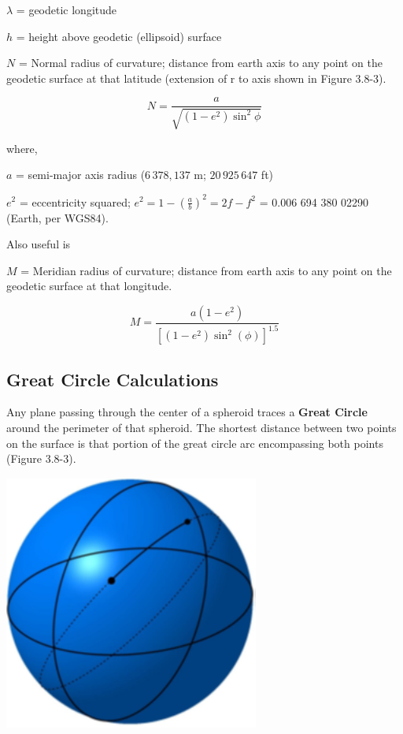 \documentclass[
]{book}
\begin{document}
\(\lambda\) = geodetic longitude

\(h\) = height above geodetic (ellipsoid) surface

\(N\) = Normal radius of curvature; distance from earth axis to any point on the geodetic surface at that latitude (extension of r to axis shown in Figure 3.8-3).

\[N = \frac{a}{\sqrt{ \left(1 - e^2 \right) \sin^{2}{\phi}}}\]

where,

\(a\) = semi-major axis radius (\(6\,378,137\) m; \(20\,925\,647\) ft)

\(e^2\) = eccentricity squared; \(e^{2} = 1 - \left( \frac{a}{b} \right)^{2} = 2f - f^{2}\) = 0.006 694 380 02290 (Earth, per WGS84).

Also useful is

\(M\) = Meridian radius of curvature; distance from earth axis to any point on the geodetic surface at that longitude.

\[M = \frac{a \left(1 - e^{2} \right)}{\left\lbrack \left( 1 - e^{2} \right)  \sin^{2}(\phi) \right\rbrack^{1.5}}\]

\hypertarget{great-circle-calculations}{%
\subsection*{Great Circle Calculations}\label{great-circle-calculations}}

Any plane passing through the center of a spheroid traces a \textbf{Great Circle} around the perimeter of that spheroid. The shortest distance between two points on the surface is that portion of the great circle arc encompassing both points (Figure 3.8-3).

\includegraphics[width=3.30506in,height=3.31132in]{media/03/image32.png}
\end{document}
